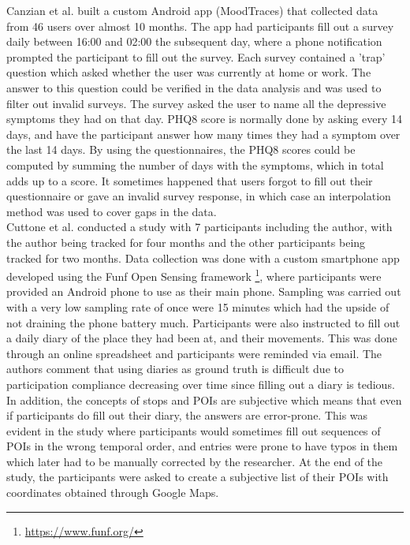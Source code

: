 Canzian et al. built a custom Android app (MoodTraces) that collected data from 46 users over almost 10 months. The app had participants fill out a survey daily between 16:00 and 02:00 the subsequent day, where a phone notification prompted the participant to fill out the survey. Each survey contained a 'trap' question which asked whether the user was currently at home or work. The answer to this question could be verified in the data analysis and was used to filter out invalid surveys. The survey asked the user to name all the depressive symptoms they had on that day. PHQ8 score is normally done by asking every 14 days, and have the participant answer how many times they had a symptom over the last 14 days. By using the questionnaires, the PHQ8 scores could be computed by summing the number of days with the symptoms, which in total adds up to a score. It sometimes happened that users forgot to fill out their questionnaire or gave an invalid survey response, in which case an interpolation method was used to cover gaps in the data.\\

Cuttone et al. conducted a study with 7 participants including the author, with the author being tracked for four months and the other participants being tracked for two months. Data collection was done with a custom smartphone app developed using the Funf Open Sensing framework \footnote{\url{https://www.funf.org/}}, where participants were provided an Android phone to use as their main phone. Sampling was carried out with a very low sampling rate of once were 15 minutes which had the upside of not draining the phone battery much. Participants were also instructed to fill out a daily diary of the place they had been at, and their movements. This was done through an online spreadsheet and participants were reminded via email. The authors comment that using diaries as ground truth is difficult due to participation compliance decreasing over time since filling out a diary is tedious. In addition, the concepts of stops and POIs are subjective which means that even if participants do fill out their diary, the answers are error-prone. This was evident in the study where participants would sometimes fill out sequences of POIs in the wrong temporal order, and entries were prone to have typos in them which later had to be manually corrected by the researcher. At the end of the study, the participants were asked to create a subjective list of their POIs with coordinates obtained through Google Maps. \\

